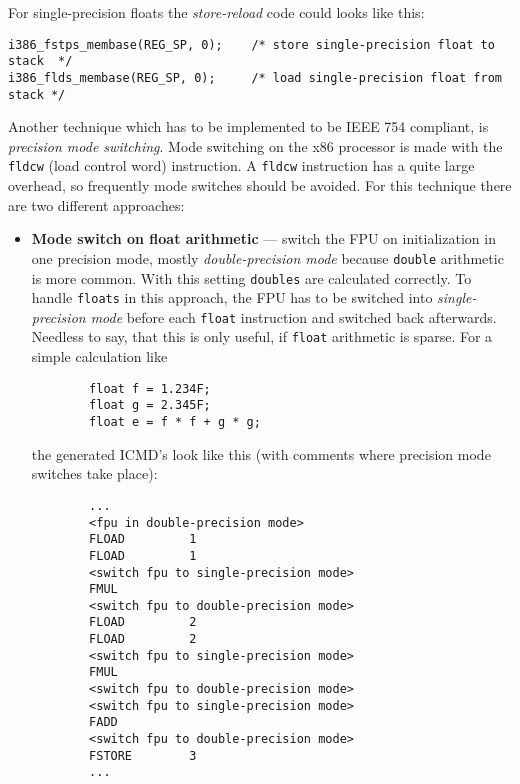 For single-precision floats the \textit{store-reload} code could looks
like this:

\begin{verbatim}
i386_fstps_membase(REG_SP, 0);    /* store single-precision float to stack  */
i386_flds_membase(REG_SP, 0);     /* load single-precision float from stack */
\end{verbatim}

Another technique which has to be implemented to be IEEE 754
compliant, is \textit{precision mode switching}. Mode switching on the
x86 processor is made with the \texttt{fldcw} (load control word)
instruction. A \texttt{fldcw} instruction has a quite large overhead,
so frequently mode switches should be avoided. For this technique
there are two different approaches:

\begin{itemize}
 \item \textbf{Mode switch on float arithmetic} --- switch the FPU on
 initialization in one precision mode, mostly \textit{double-precision
 mode} because \texttt{double} arithmetic is more common. With this
 setting \texttt{doubles} are calculated correctly. To handle
 \texttt{floats} in this approach, the FPU has to be switched into
 \textit{single-precision mode} before each \texttt{float} instruction
 and switched back afterwards. Needless to say, that this is only
 useful, if \texttt{float} arithmetic is sparse. For a simple
 calculation like

 \begin{verbatim}
        float f = 1.234F;
        float g = 2.345F;
        float e = f * f + g * g;
 \end{verbatim}        

 the generated ICMD's look like this (with comments where precision
 mode switches take place):

 \begin{verbatim}
        ...
        <fpu in double-precision mode>
        FLOAD         1
        FLOAD         1
        <switch fpu to single-precision mode>
        FMUL         
        <switch fpu to double-precision mode>
        FLOAD         2
        FLOAD         2
        <switch fpu to single-precision mode>
        FMUL         
        <switch fpu to double-precision mode>
        <switch fpu to single-precision mode>
        FADD         
        <switch fpu to double-precision mode>
        FSTORE        3
        ...
 \end{verbatim}


\end{itemize}
